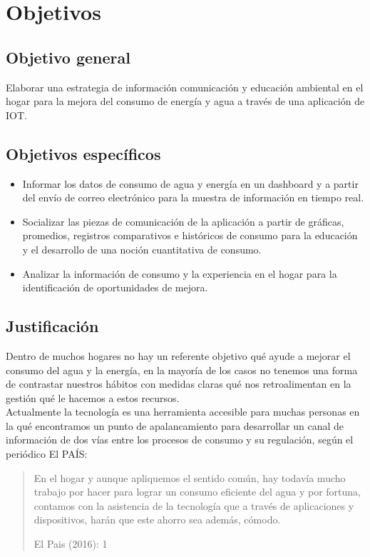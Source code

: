 \documentclass[a4paper,man,natbib]{apa6}
\begin{document}
\section{Objetivos}
\subsection{Objetivo general}
Elaborar una estrategia de información comunicación y educación ambiental en el hogar para la mejora del consumo de energía y agua a través de una aplicación de IOT.

\subsection{Objetivos específicos}
\begin{itemize}
      \item Informar los datos de consumo de agua y energía en un dashboard y a partir del envío de correo electrónico para la muestra de información en tiempo real.
      \item Socializar las piezas de comunicación de la aplicación a partir de gráficas, promedios, registros comparativos e históricos de consumo para la educación y el desarrollo de una noción cuantitativa de consumo.
      \item Analizar la información de consumo y la experiencia en el hogar para la identificación de oportunidades de mejora.
\end{itemize}

\subsection{Justificación}
Dentro de muchos hogares no hay un referente objetivo qué ayude a mejorar el consumo del agua y la energía, en la mayoría de los casos no tenemos una forma de contrastar nuestros hábitos con medidas claras qué nos retroalimentan en la gestión qué le hacemos a estos recursos.\\

Actualmente la tecnología es una herramienta accesible para muchas personas en la qué encontramos un punto de apalancamiento para desarrollar un canal de información de dos vías entre los procesos de consumo y su regulación, según el periódico El PAÍS:\\

\begin{quote}
    \vspace{5pt}
    {\small
    En el hogar y aunque apliquemos el sentido común, hay todavía mucho trabajo por hacer para lograr un consumo eficiente del agua y por fortuna, contamos con la asistencia de la tecnología que a través de aplicaciones y dispositivos, harán que este ahorro sea además, cómodo.
    }
    \begin{flushright}
        El Pais (2016): 1
    \end{flushright}

\end{quote}
\end{document}
